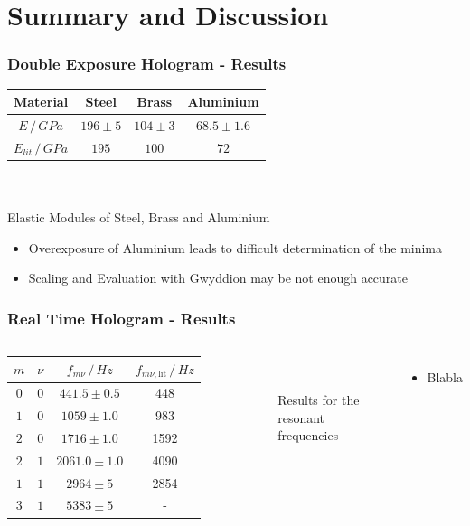 \documentclass{beamer}
\begin{document}
\section{Summary and Discussion}
\frame{\tableofcontents[currentsection]}
\begin{frame}
	\frametitle{Double Exposure Hologram - Results}
	\begin{table}
		\begin{tabular}{c|ccc}
			Material&Steel&Brass&Aluminium\\\hline
			$E\,/\,\si{GPa}$&$196\pm5$&$104\pm3$&$68.5\pm1.6$\\
			$E_{lit}\,/\,\si{GPa}$\footfullcite{staats}&$195$&$100$&$72$
		\end{tabular}\\\scriptsize\ \\
		{\small Elastic Modules of Steel, Brass and Aluminium}
	\end{table}
	\pause
	\begin{itemize}
		\item Overexposure of Aluminium leads to difficult determination of the minima
		\pause
		\item Scaling and Evaluation with Gwyddion may be not enough accurate
	\end{itemize}
\end{frame}
\begin{frame}
	\frametitle{Real Time Hologram - Results}
	\begin{columns}
			\begin{table}
				\centering
				\begin{tabular}{c|c|c|c}
					$m$ & $\nu$ 		& $f_{m\nu}\,/\,\si{Hz}$ 	& $f_{m\nu, \text{lit}}\,/\,\si{Hz}$\\ \hline\hline
					$0$&$0$	& $441.5\pm0.5$					& 448	\\ \hline
					$1$&$0$	& $1059\pm1.0$				& 983	\\ \hline
					$2$&$0$	& $1716\pm1.0$				& 1592	\\ \hline
					$2$&$1$	& $2061.0\pm1.0$				& 4090	\\ \hline
					$1$&$1$	& $2964\pm5$				& 2854 \\ \hline
					$3$&$1$	& $5383\pm5$				&-
				\end{tabular}\\\scriptsize\ \\\small
				{Results for the resonant frequencies}
			\end{table}
			\begin{itemize}
				\item Blabla
			\end{itemize}
	\end{columns}
\end{frame}
\end{document}
